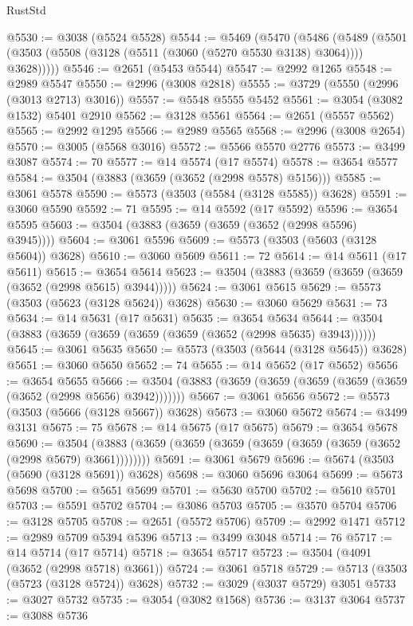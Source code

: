 \begin{lexlean}{RustStd}
\begin{coremodule}
@5530 := @3038 (@5524 @5528)
@5544 := @5469
    (@5470
      (@5486
        (@5489 (@5501 (@3503 (@5508 (@3128 (@5511 (@3060 (@5270 @5530 @3138) @3064)))) @3628)))))
@5546 := @2651 (@5453 @5544)
@5547 := @2992 @1265
@5548 := @2989 @5547
@5550 := @2996 (@3008 @2818)
@5555 := @3729 (@5550 (@2996 (@3013 @2713) @3016))
@5557 := @5548 @5555 @5452
@5561 := @3054 (@3082 @1532) @5401 @2910
@5562 := @3128 @5561
@5564 := @2651 (@5557 @5562)
@5565 := @2992 @1295
@5566 := @2989 @5565
@5568 := @2996 (@3008 @2654)
@5570 := @3005 (@5568 @3016)
@5572 := @5566 @5570 @2776
@5573 := @3499 @3087
@5574 := 70
@5577 := @14 @5574 (@17 @5574)
@5578 := @3654 @5577
@5584 := @3504 (@3883 (@3659 (@3652 (@2998 @5578) @5156)))
@5585 := @3061 @5578
@5590 := @5573 (@3503 (@5584 (@3128 @5585)) @3628)
@5591 := @3060 @5590
@5592 := 71
@5595 := @14 @5592 (@17 @5592)
@5596 := @3654 @5595
@5603 := @3504 (@3883 (@3659 (@3659 (@3652 (@2998 @5596) @3945))))
@5604 := @3061 @5596
@5609 := @5573 (@3503 (@5603 (@3128 @5604)) @3628)
@5610 := @3060 @5609
@5611 := 72
@5614 := @14 @5611 (@17 @5611)
@5615 := @3654 @5614
@5623 := @3504 (@3883 (@3659 (@3659 (@3659 (@3652 (@2998 @5615) @3944)))))
@5624 := @3061 @5615
@5629 := @5573 (@3503 (@5623 (@3128 @5624)) @3628)
@5630 := @3060 @5629
@5631 := 73
@5634 := @14 @5631 (@17 @5631)
@5635 := @3654 @5634
@5644 := @3504 (@3883 (@3659 (@3659 (@3659 (@3659 (@3652 (@2998 @5635) @3943))))))
@5645 := @3061 @5635
@5650 := @5573 (@3503 (@5644 (@3128 @5645)) @3628)
@5651 := @3060 @5650
@5652 := 74
@5655 := @14 @5652 (@17 @5652)
@5656 := @3654 @5655
@5666 := @3504 (@3883 (@3659 (@3659 (@3659 (@3659 (@3659 (@3652 (@2998 @5656) @3942)))))))
@5667 := @3061 @5656
@5672 := @5573 (@3503 (@5666 (@3128 @5667)) @3628)
@5673 := @3060 @5672
@5674 := @3499 @3131
@5675 := 75
@5678 := @14 @5675 (@17 @5675)
@5679 := @3654 @5678
@5690 := @3504 (@3883 (@3659 (@3659 (@3659 (@3659 (@3659 (@3659 (@3652 (@2998 @5679) @3661))))))))
@5691 := @3061 @5679
@5696 := @5674 (@3503 (@5690 (@3128 @5691)) @3628)
@5698 := @3060 @5696 @3064
@5699 := @5673 @5698
@5700 := @5651 @5699
@5701 := @5630 @5700
@5702 := @5610 @5701
@5703 := @5591 @5702
@5704 := @3086 @5703
@5705 := @3570 @5704
@5706 := @3128 @5705
@5708 := @2651 (@5572 @5706)
@5709 := @2992 @1471
@5712 := @2989 @5709 @5394 @5396
@5713 := @3499 @3048
@5714 := 76
@5717 := @14 @5714 (@17 @5714)
@5718 := @3654 @5717
@5723 := @3504 (@4091 (@3652 (@2998 @5718) @3661))
@5724 := @3061 @5718
@5729 := @5713 (@3503 (@5723 (@3128 @5724)) @3628)
@5732 := @3029 (@3037 @5729) @3051
@5733 := @3027 @5732
@5735 := @3054 (@3082 @1568)
@5736 := @3137 @3064
@5737 := @3088 @5736

\end{coremodule}
\end{lexlean}
